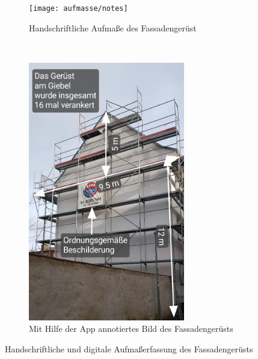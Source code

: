 \begin{figure}[h]
  \begin{subfigure}[t]{0.4\textwidth}
    \centering
    \texttt{[image: aufmasse/notes]}
    \caption{Handschriftliche Aufmaße des Fassadengerüst}
    \label{fig:old}
  \end{subfigure}
  ~
  \begin{subfigure}[t]{0.4\textwidth}
    \centering
    \includegraphics[keepaspectratio, width=0.75\textwidth]{data/annotated}
    \caption{Mit Hilfe der App annotiertes Bild des Fassadengerüsts}
    \label{fig:new}
  \end{subfigure}
  \centering
  \caption{Handschriftliche und digitale Aufmaßerfassung des Fassadengerüsts}
  \label{fig:comparison}
\end{figure}

